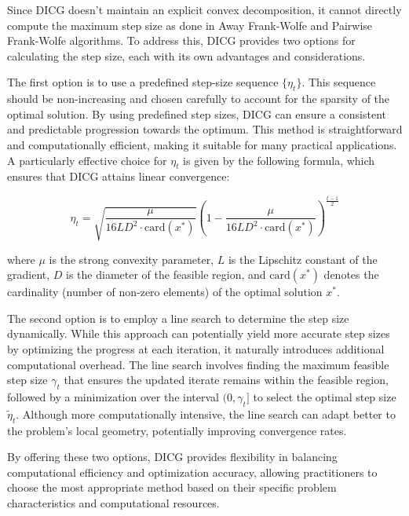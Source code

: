 Since DICG doesn't maintain an explicit convex decomposition, it cannot directly compute the maximum step size as done in Away Frank-Wolfe and Pairwise Frank-Wolfe algorithms. To address this, DICG provides two options for calculating the step size, each with its own advantages and considerations.

The first option is to use a predefined step-size sequence \(\{\eta_t\}\). This sequence should be non-increasing and chosen carefully to account for the sparsity of the optimal solution. By using predefined step sizes, DICG can ensure a consistent and predictable progression towards the optimum. This method is straightforward and computationally efficient, making it suitable for many practical applications. A particularly effective choice for \(\eta_t\) is given by the following formula, which ensures that DICG attains linear convergence:

\[
\eta_t = \sqrt{\frac{\mu}{16LD^2 \cdot \text{card}(x^*)}} \left( 1 - \frac{\mu}{16LD^2 \cdot \text{card}(x^*)} \right)^{\frac{t-1}{2}}
\]

where \(\mu\) is the strong convexity parameter, \(L\) is the Lipschitz constant of the gradient, \(D\) is the diameter of the feasible region, and \(\text{card}(x^*)\) denotes the cardinality (number of non-zero elements) of the optimal solution \(x^*\).

The second option is to employ a line search to determine the step size dynamically. While this approach can potentially yield more accurate step sizes by optimizing the progress at each iteration, it naturally introduces additional computational overhead. The line search involves finding the maximum feasible step size \(\gamma_t\) that ensures the updated iterate remains within the feasible region, followed by a minimization over the interval \((0, \gamma_t]\) to select the optimal step size \(\widetilde{\eta}_t\). Although more computationally intensive, the line search can adapt better to the problem's local geometry, potentially improving convergence rates.

By offering these two options, DICG provides flexibility in balancing computational efficiency and optimization accuracy, allowing practitioners to choose the most appropriate method based on their specific problem characteristics and computational resources.




